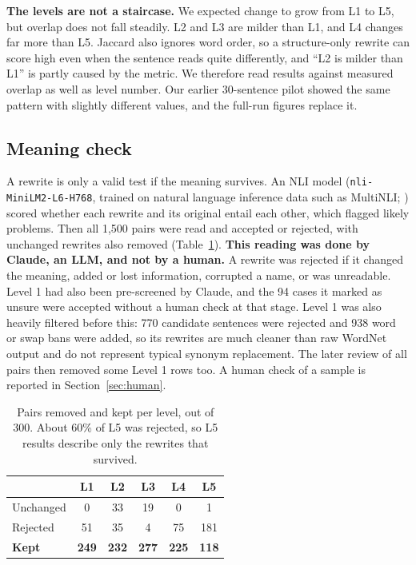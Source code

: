 \documentclass[11pt]{article}
\begin{document}
\textbf{The levels are not a staircase.} We expected change to grow from L1 to L5, but overlap does not fall steadily. L2 and L3 are milder than L1, and L4 changes far more than L5. Jaccard also ignores word order, so a structure-only rewrite can score high even when the sentence reads quite differently, and “L2 is milder than L1” is partly caused by the metric. We therefore read results against measured overlap as well as level number. Our earlier 30-sentence pilot showed the same pattern with slightly different values, and the full-run figures replace it.

\subsection{Meaning check}
A rewrite is only a valid test if the meaning survives. An NLI model (\texttt{nli-MiniLM2-L6-H768}, trained on natural language inference data such as MultiNLI; \citealp{williams2018}) scored whether each rewrite and its original entail each other, which flagged likely problems. Then all 1,500 pairs were read and accepted or rejected, with unchanged rewrites also removed (Table~\ref{tab:kept}). \textbf{This reading was done by Claude, an LLM, and not by a human.} A rewrite was rejected if it changed the meaning, added or lost information, corrupted a name, or was unreadable. Level 1 had also been pre-screened by Claude, and the 94 cases it marked as unsure were accepted without a human check at that stage. Level 1 was also heavily filtered before this: 770 candidate sentences were rejected and 938 word or swap bans were added, so its rewrites are much cleaner than raw WordNet output and do not represent typical synonym replacement. The later review of all pairs then removed some Level 1 rows too. A human check of a sample is reported in Section~\ref{sec:human}.

\begin{table}[t]
\centering\small
\begin{tabular}{@{}lccccc@{}}
\toprule
 & \textbf{L1} & \textbf{L2} & \textbf{L3} & \textbf{L4} & \textbf{L5} \\
\midrule
Unchanged & 0 & 33 & 19 & 0 & 1 \\
Rejected & 51 & 35 & 4 & 75 & 181 \\
\textbf{Kept} & \textbf{249} & \textbf{232} & \textbf{277} & \textbf{225} & \textbf{118} \\
\bottomrule
\end{tabular}
\caption{Pairs removed and kept per level, out of 300. About 60\% of L5 was rejected, so L5 results describe only the rewrites that survived.}
\label{tab:kept}
\end{table}
\end{document}
